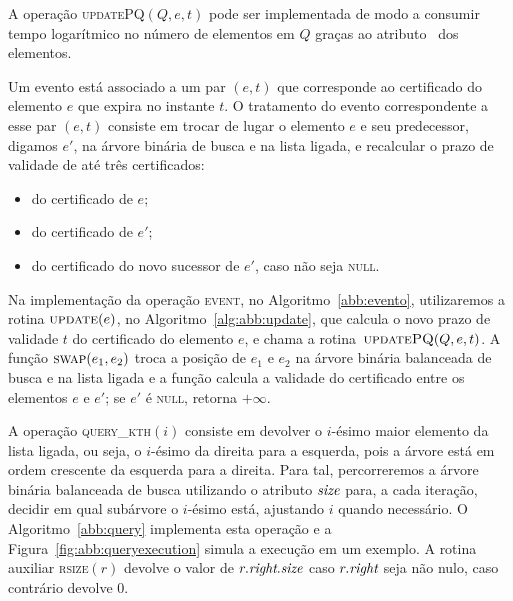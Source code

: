 A operação \textsc{updatePQ}$(Q,e,t)$ pode ser implementada de modo
a consumir tempo logarítmico no número de elementos em $Q$ graças ao
atributo \pqpos~dos elementos.

Um evento está associado a um par $(e, t)$ que corresponde ao
certificado do elemento $e$ que expira no instante $t$.
O tratamento do evento correspondente a esse par $(e, t)$ consiste em trocar de
lugar o elemento $e$ e seu predecessor, digamos $e'$, na árvore
binária de busca e na lista ligada, e recalcular o prazo de validade
de até três certificados:

\begin{itemize}
    \item do certificado de $e$;
    \item do certificado de $e'$;
    \item do certificado do novo sucessor de $e'$, caso não seja \textsc{null}.
\end{itemize}

Na implementação da operação \textsc{event}, no Algoritmo~\ref{abb:evento}, utilizaremos a rotina
$\textsc{update}(e)$, no Algoritmo~\ref{alg:abb:update}, que calcula o novo prazo de validade $t$
do certificado do elemento $e$, e chama a rotina~$\textsc{updatePQ}(Q, e, t)$.
A função $\textsc{swap}(e_1, e_2)$ troca a posição de $e_1$ e $e_2$ na árvore binária balanceada
de busca e na lista ligada e a função  calcula
a validade do certificado entre os elementos $e$ e $e'$; se $e'$ é
\textsc{null}, retorna $+\infty$.









A operação \textsc{query\_kth}$(i)$ consiste em devolver o $i$-ésimo
maior elemento da lista ligada, ou seja, o $i$-ésimo da direita para
a esquerda, pois a árvore está em ordem crescente da esquerda para a
direita.
Para tal, percorreremos a árvore binária balanceada de busca utilizando o atributo $\textit{size}$
para, a cada iteração, decidir em qual subárvore o $i$-ésimo está, ajustando $i$ quando
necessário.
O Algoritmo~\ref{abb:query} implementa esta operação e a Figura~\ref{fig:abb:queryexecution}
simula a execução em um exemplo.
A rotina auxiliar \textsc{rsize}$(r)$ devolve o valor de $r.\textit{right}.\textit{size}$ caso $r.\textit{right}$ seja não nulo, caso
contrário devolve $0$.

